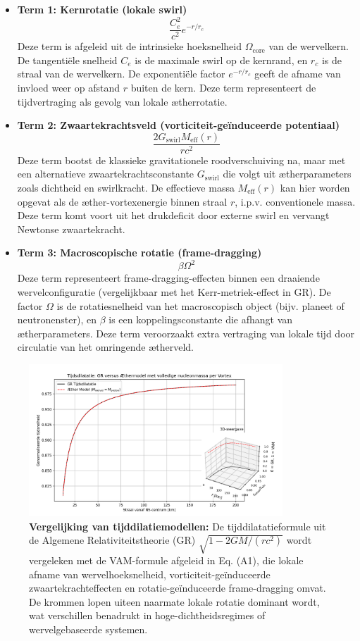 \begin{itemize}
  \item \textbf{Term 1: Kernrotatie (lokale swirl)}
  \[
  \frac{C_e^2}{c^2} e^{-r/r_c}
  \]
  Deze term is afgeleid uit de intrinsieke hoeksnelheid $\Omega_\text{core}$ van de wervelkern. De tangentiële snelheid $C_e$ is de maximale swirl op de kernrand, en $r_c$ is de straal van de wervelkern. De exponentiële factor $e^{-r/r_c}$ geeft de afname van invloed weer op afstand $r$ buiten de kern. Deze term representeert de tijdvertraging als gevolg van lokale ætherrotatie.

  \item \textbf{Term 2: Zwaartekrachtsveld (vorticiteit-geïnduceerde potentiaal)}
  \[
  \frac{2 G_\text{swirl} M_\text{eff}(r)}{r c^2}
  \]
  Deze term bootst de klassieke gravitationele roodverschuiving na, maar met een alternatieve zwaartekrachtsconstante $G_\text{swirl}$ die volgt uit ætherparameters zoals dichtheid en swirlkracht. De effectieve massa $M_\text{eff}(r)$ kan hier worden opgevat als de æther-vortexenergie binnen straal $r$, i.p.v. conventionele massa. Deze term komt voort uit het drukdeficit door externe swirl en vervangt Newtonse zwaartekracht.

  \item \textbf{Term 3: Macroscopische rotatie (frame-dragging)}
  \[
  \beta \Omega^2
  \]
  Deze term representeert frame-dragging-effecten binnen een draaiende wervelconfiguratie (vergelijkbaar met het Kerr-metriek-effect in GR). De factor $\Omega$ is de rotatiesnelheid van het macroscopisch object (bijv. planeet of neutronenster), en $\beta$ is een koppelingsconstante die afhangt van ætherparameters. Deze term veroorzaakt extra vertraging van lokale tijd door circulatie van het omringende ætherveld.

\end{itemize}

\begin{figure}[H]
  \centering
  \includegraphics[width=0.85\textwidth]{07-TimeDilationGRVsVAM_nl}
  \caption{
  \textbf{Vergelijking van tijddilatiemodellen:} De tijddilatatieformule uit de Algemene Relativiteitstheorie (GR) \(\sqrt{1 - 2GM/(rc^2)}\) wordt vergeleken met de VAM-formule afgeleid in Eq. (A1), die lokale afname van wervelhoeksnelheid, vorticiteit-geïnduceerde zwaartekrachteffecten en rotatie-geïnduceerde frame-dragging omvat. De krommen lopen uiteen naarmate lokale rotatie dominant wordt, wat verschillen benadrukt in hoge-dichtheidsregimes of wervelgebaseerde systemen.
  }
  \label{fig:GRvsVAMTimeDilation}
\end{figure}

